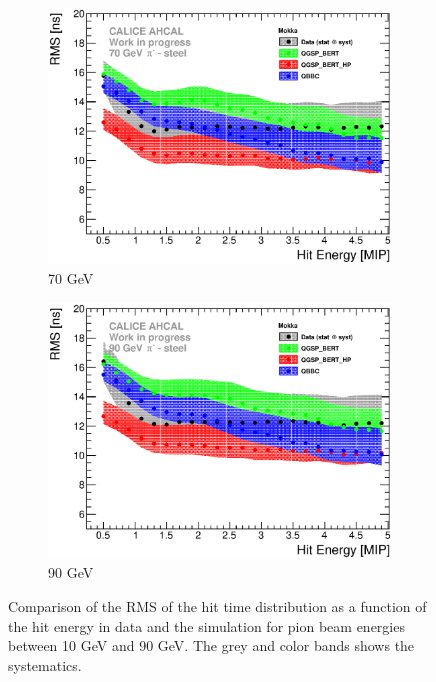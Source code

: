 \begin{figure}[htbp!]
  \hfill
  \begin{subfigure}[t]{0.49\textwidth}
    \centering
    \includegraphics[width=1\textwidth]{../Thesis_Plots/Timing/Pions/Plots/ComparisonToSim/RMS_Energy_70GeV_Mokka.eps}
    \caption{70 GeV}\label{fig:Energy_RMS_SimData_70GeV}
  \end{subfigure}
  \hfill
  \begin{subfigure}[t]{0.49\textwidth}
    \centering
    \includegraphics[width=1\textwidth]{../Thesis_Plots/Timing/Pions/Plots/ComparisonToSim/RMS_Energy_90GeV_Mokka.eps}
    \caption{90 GeV}\label{fig:Energy_RMS_SimData_90GeV}
  \end{subfigure}
  \caption{Comparison of the RMS of the hit time distribution as a function of the hit energy in data and the \mokka simulation for pion beam energies between 10 GeV and 90 GeV. The grey and color bands shows the systematics.}
  \label{fig:Energy_RMS_SimData_Comparison_Mokka}
\end{figure}


